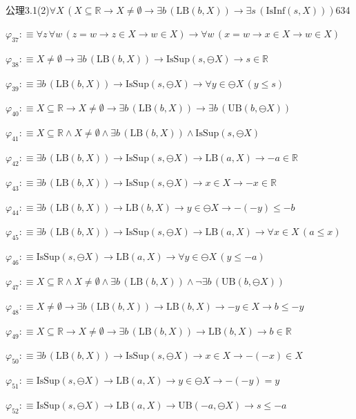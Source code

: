 \begin{fullproof}{公理3.1(2)}{$\forall X\,(X \subseteq \mathbb{R} \to X \neq \emptyset \to \exists b\,(\mathrm{LB}(b,X)) \to \exists s\,(\mathrm{IsInf}(s,X)))$}{634}
\begin{abbrevlist}
\item $\varphi_{37} :\equiv \forall z\,\forall w\,(z = w \to z \in X \to w \in X) \to \forall w\,(x = w \to x \in X \to w \in X)$
\item $\varphi_{38} :\equiv X \neq \emptyset \to \exists b\,(\mathrm{LB}(b,X)) \to \mathrm{IsSup}(s,\ominus X) \to s \in \mathbb{R}$
\item $\varphi_{39} :\equiv \exists b\,(\mathrm{LB}(b,X)) \to \mathrm{IsSup}(s,\ominus X) \to \forall y \in \ominus X\,(y \leq s)$
\item $\varphi_{40} :\equiv X \subseteq \mathbb{R} \to X \neq \emptyset \to \exists b\,(\mathrm{LB}(b,X)) \to \exists b\,(\mathrm{UB}(b,\ominus X))$
\item $\varphi_{41} :\equiv X \subseteq \mathbb{R} \land X \neq \emptyset \land \exists b\,(\mathrm{LB}(b,X)) \land \mathrm{IsSup}(s,\ominus X)$
\item $\varphi_{42} :\equiv \exists b\,(\mathrm{LB}(b,X)) \to \mathrm{IsSup}(s,\ominus X) \to \mathrm{LB}(a,X) \to -a \in \mathbb{R}$
\item $\varphi_{43} :\equiv \exists b\,(\mathrm{LB}(b,X)) \to \mathrm{IsSup}(s,\ominus X) \to x \in X \to -x \in \mathbb{R}$
\item $\varphi_{44} :\equiv \exists b\,(\mathrm{LB}(b,X)) \to \mathrm{LB}(b,X) \to y \in \ominus X \to -(-y) \leq -b$
\item $\varphi_{45} :\equiv \exists b\,(\mathrm{LB}(b,X)) \to \mathrm{IsSup}(s,\ominus X) \to \mathrm{LB}(a,X) \to \forall x \in X\,(a \leq x)$
\item $\varphi_{46} :\equiv \mathrm{IsSup}(s,\ominus X) \to \mathrm{LB}(a,X) \to \forall y \in \ominus X\,(y \leq -a)$
\item $\varphi_{47} :\equiv X \subseteq \mathbb{R} \land X \neq \emptyset \land \exists b\,(\mathrm{LB}(b,X)) \land \neg \exists b\,(\mathrm{UB}(b,\ominus X))$
\item $\varphi_{48} :\equiv X \neq \emptyset \to \exists b\,(\mathrm{LB}(b,X)) \to \mathrm{LB}(b,X) \to -y \in X \to b \leq -y$
\item $\varphi_{49} :\equiv X \subseteq \mathbb{R} \to X \neq \emptyset \to \exists b\,(\mathrm{LB}(b,X)) \to \mathrm{LB}(b,X) \to b \in \mathbb{R}$
\item $\varphi_{50} :\equiv \exists b\,(\mathrm{LB}(b,X)) \to \mathrm{IsSup}(s,\ominus X) \to x \in X \to -(-x) \in X$
\item $\varphi_{51} :\equiv \mathrm{IsSup}(s,\ominus X) \to \mathrm{LB}(a,X) \to y \in \ominus X \to -(-y) = y$
\item $\varphi_{52} :\equiv \mathrm{IsSup}(s,\ominus X) \to \mathrm{LB}(a,X) \to \mathrm{UB}(-a,\ominus X) \to s \leq -a$

\end{abbrevlist}
\end{fullproof}
